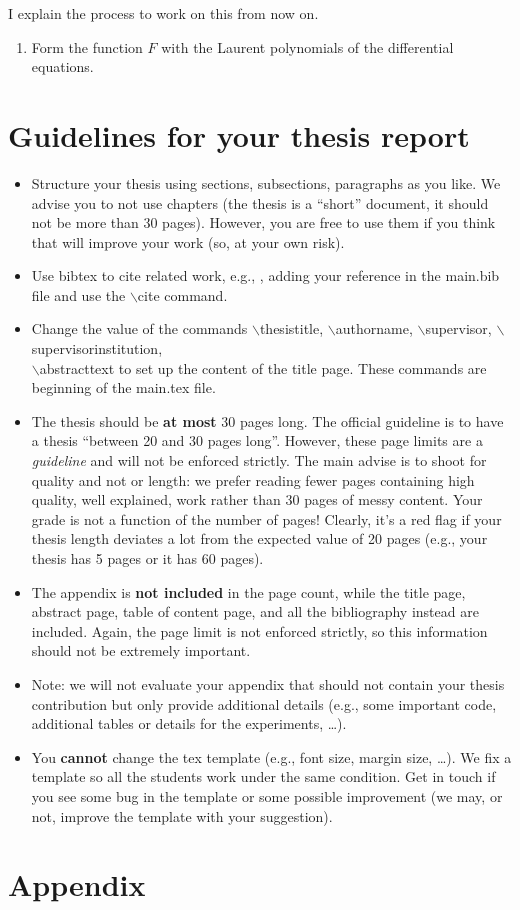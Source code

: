\documentclass[oneside, a4paper, onecolumn, 11pt]{article}
\begin{document}
I explain the process to  work on this from now on.

\begin{enumerate}[label=Step \arabic*:]
    \item Form the function \(F\) with the Laurent polynomials of the differential equations.
\end{enumerate}

\newpage

\section{Guidelines for your thesis report}

\begin{itemize}
    \item Structure your thesis using sections, subsections, paragraphs as you like. We advise you to not use chapters (the thesis is a ``short'' document, it should not be more than 30 pages). However, you are free to use them if you think that will improve your work (so, at your own risk).
    \item Use bibtex to cite related work, e.g., \cite{DBLP:journals/x/Turing37}, adding your reference in the {main.bib} file and use the {$\backslash$cite} command.
    \item Change the value of the commands {$\backslash$thesistitle}, {$\backslash$authorname}, {$\backslash$supervisor}, {$\backslash$supervisorinstitution}, \\ {$\backslash$abstracttext} to set up the content of the title page. These commands are beginning of the {main.tex} file.
    \item The thesis should be \textbf{at most} 30 pages long. The official guideline is to have a thesis ``between 20 and 30 pages long''. However, these page limits are a \emph{guideline} and will not be enforced strictly.
          The main advise is to shoot for quality and not or length: we prefer reading fewer pages containing high quality, well explained, work rather than 30 pages of messy content. Your grade is not a function of the number of pages!
          Clearly, it's a red flag if your thesis length deviates a lot from the expected value of 20 pages (e.g., your thesis has 5 pages or it has 60 pages).
    \item The appendix is \textbf{not included} in the page count, while the title page, abstract page, table of content page, and all the bibliography instead are included. Again, the page limit is not enforced strictly, so this information should not be extremely important.
    \item Note: we will not evaluate your appendix that should not contain your thesis contribution but only provide additional details (e.g., some important code, additional tables or details for the experiments, \ldots).
    \item You \textbf{cannot} change the tex template (e.g., font size, margin size, \ldots). We fix a template so all the students work under the same condition. Get in touch if you see some bug in the template or some possible improvement (we may, or not, improve the template with your suggestion).
\end{itemize}

\newpage



\newpage
\appendix

\section{Appendix}
\label{sec:appendix}
\end{document}
